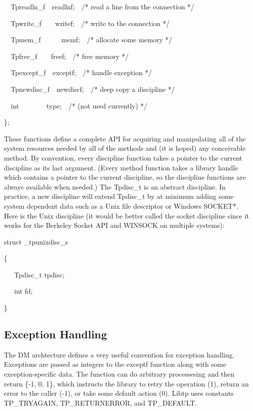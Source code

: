{\ttfamily\mdseries
\ \ Tpreadln\_f\ \ readlnf;\ \ /* read a line from the connection */}

{\ttfamily\mdseries
\ \ Tpwrite\_f\ \ \ \ writef;\ \ /* write to the connection */}

{\ttfamily\mdseries
\ \ Tpmem\_f\ \ \ \ \ \ memf;\ \ /* allocate some memory */}

{\ttfamily\mdseries
\ \ Tpfree\_f\ \ \ \ freef;\ \ /* free memory */}

{\ttfamily\mdseries
\ \ Tpexcept\_f\ \ exceptf;\ \ /* handle exception */}

{\ttfamily\mdseries
\ \ Tpnewdisc\_f\ \ newdiscf;\ \ /* deep copy a discipline */}

{\ttfamily\mdseries
\ \ int\ \ \ \ \ \ \ \ type;\ \ /* (not used currently) */}

{\ttfamily\mdseries
\};}


\bigskip


These functions define a complete API for acquiring and manipulating
all of the system resources needed by all of the methods and (it is
hoped) any conceivable method. By convention, every discipline
function takes a pointer to the current discipline as its last
argument. (Every method function takes a library handle which contains
a pointer to the current discipline, so the discipline functions are
always available when needed.) The Tpdisc\_t is an abstract
discipline. In practice, a new discipline will extend Tpdisc\_t by at
minimum adding some system dependent data such as a Unix file
descriptor or Windows SOCKET*. Here is the
{\textquotedbl}Unix{\textquotedbl} discipline (it would be better
called the socket discipline since it works for the Berkeley Socket
API and WINSOCK on multiple systems):

{\ttfamily\mdseries
struct \_tpunixdisc\_s}

{\ttfamily\mdseries
\{}

{\ttfamily\mdseries
\ \ \ Tpdisc\_t tpdisc;}

{\ttfamily\mdseries
\ \ \ int fd;}

{\ttfamily\mdseries
\}}

\subsection{Exception Handling}

The DM archtecture defines a very useful convention for exception
handling. Exceptions are passed as integers to the exceptf function
along with some exception-specific data. The function can do arbitrary
processesing and then return \{-1, 0, 1\}, which instructs the library
to retry the operation (1), return an error to the caller (-1), or
take some default action (0). Libtp uses constants TP\_TRYAGAIN,
TP\_RETURNERROR, and TP\_DEFAULT.

